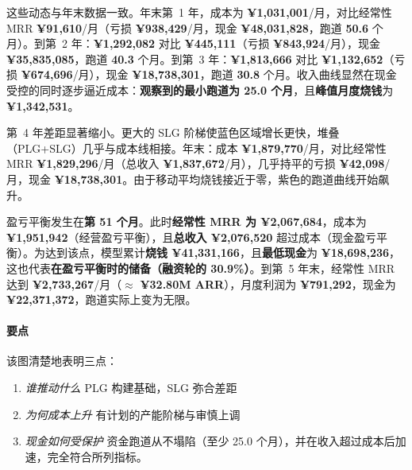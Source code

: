 \documentclass[11pt, a4paper, oneside]{article}
\begin{document}
这些动态与年末数据一致。年末第~1 年，成本为 \textbf{¥1{,}031{,}001}/月，对比经常性 MRR \textbf{¥91{,}610}/月（亏损 \textbf{¥938{,}429}/月，现金 \textbf{¥48{,}031{,}828}，跑道 \textbf{50.6} 个月）。到第~2 年：\textbf{¥1{,}292{,}082} 对比 \textbf{¥445{,}111}（亏损 \textbf{¥843{,}924}/月），现金 \textbf{¥35{,}835{,}085}，跑道 \textbf{40.3} 个月。到第~3 年：\textbf{¥1{,}813{,}666} 对比 \textbf{¥1{,}132{,}652}（亏损 \textbf{¥674{,}696}/月），现金 \textbf{¥18{,}738{,}301}，跑道 \textbf{30.8} 个月。收入曲线显然在现金受控的同时逐步逼近成本：\textbf{观察到的最小跑道为 25.0 个月}，且\textbf{峰值月度烧钱}为 \textbf{¥1{,}342{,}531}。

第~4 年差距显著缩小。更大的 SLG 阶梯使蓝色区域增长更快，堆叠（PLG+SLG）几乎与成本线相接。年末：成本 \textbf{¥1{,}879{,}770}/月，对比经常性 MRR \textbf{¥1{,}829{,}296}/月（总收入 \textbf{¥1{,}837{,}672}/月），几乎持平的亏损 \textbf{¥42{,}098}/月，现金 \textbf{¥18{,}738{,}301}。由于移动平均烧钱接近于零，紫色的跑道曲线开始飙升。

盈亏平衡发生在\textbf{第 51 个月}。此时\textbf{经常性 MRR 为 ¥2{,}067{,}684}，成本为\textbf{¥1{,}951{,}942}（经营盈亏平衡），且\textbf{总收入 ¥2{,}076{,}520} 超过成本（现金盈亏平衡）。为达到该点，模型累计\textbf{烧钱 ¥41{,}331{,}166}，且\textbf{最低现金}为 \textbf{¥18{,}698{,}236}，这也代表\textbf{在盈亏平衡时的储备（融资轮的 30.9\%）}。到第~5 年末，经常性 MRR 达到 \textbf{¥2{,}733{,}267}/月（$ \approx $ \textbf{¥32.80M ARR}），月度利润为 \textbf{¥791{,}292}，现金为 \textbf{¥22{,}371{,}372}，跑道实际上变为无限。



\paragraph{要点}
该图清楚地表明三点：
\begin{enumerate}
\item \emph{谁推动什么} PLG 构建基础，SLG 弥合差距
\item \emph{为何成本上升} 有计划的产能阶梯与审慎上调
\item \emph{现金如何受保护} 资金跑道从不塌陷（至少 25.0 个月），并在收入超过成本后加速，完全符合所列指标。
\end{enumerate}
\end{document}
